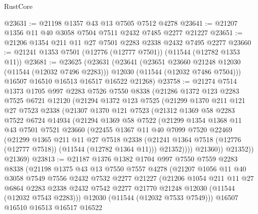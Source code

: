 \begin{lexlean}{RustCore}
\begin{coremodule}
@23631 := @21198 @1357 @43 @13 @7505 @7512 @4278
@23641 := @21207 @1356 @11 @40 @3058 @7504 @7511 @2432 @7485 @2277 @21227
@23651 := @21206 @1354 @211 @11 @27 @7501 @2283 @2338 @2432 @7495 @2277
@23660 := @21241 @1353 @7501 (@12776 (@12777 @7501)) (@11544 (@12782 @1353 @11))
@23681 := @23625
    (@23631
      (@23641
        (@23651 @23660 @21248 @12030 (@11544 (@12032 @7496 @2283)))
        @12030
        (@11544 (@12032 @7486 @7504)))
      @16507
      @16510
      @16513
      @16517
      @16522
      @21268)
@23758 := @21274
    @7514
    @1373
    @1705
    @997
    @2283
    @7526
    @7550
    @8338
    (@21286
      @1372
      @123
      @2283
      @7525
      @6721
      @12120
      (@21294
        @1372
        @123
        @7525
        (@21299
          @1370
          @211
          @121
          @27
          @7523
          @2338
          (@21307
            @1370
            @121
            @7523
            (@21312
              @1369
              @58
              @2283
              @7522
              @6724
              @14934
              (@21294
                @1369
                @58
                @7522
                (@21299
                  @1354
                  @1368
                  @11
                  @43
                  @7501
                  @7521
                  @23660
                  (@22455
                    @1367
                    @11
                    @40
                    @7099
                    @7520
                    @22469
                    (@21299
                      @1365
                      @211
                      @11
                      @27
                      @7518
                      @2338
                      (@21241 @1364 @7518 (@12776 (@12777 @7518)) (@11544 (@12782 @1364 @11)))
                      @21352))))
              @21360))
          @21352))
      @21369)
@23813 := @21187
    @1376
    @1382
    @1704
    @997
    @7550
    @7559
    @2283
    @8338
    (@21198
      @1375
      @43
      @13
      @7550
      @7557
      @4278
      (@21207
        @1056
        @11
        @40
        @3058
        @7549
        @7556
        @2432
        @7532
        @2277
        @21227
        (@21206
          @1054
          @211
          @11
          @27
          @6864
          @2283
          @2338
          @2432
          @7542
          @2277
          @21770
          @21248
          @12030
          (@11544 (@12032 @7543 @2283)))
        @12030
        (@11544 (@12032 @7533 @7549)))
      @16507
      @16510
      @16513
      @16517
      @16522

\end{coremodule}
\end{lexlean}
